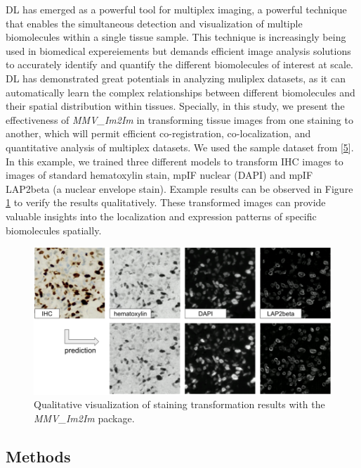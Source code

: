 DL has emerged as a powerful tool for multiplex imaging, a powerful technique that enables the simultaneous detection and visualization of multiple biomolecules within a single tissue sample. This technique is increasingly being used in biomedical expereiements but demands efficient image analysis solutions to accurately identify and quantify the different biomolecules of interest at scale. DL has demonstrated great potentials in analyzing muliplex datasets, as it can automatically learn the complex relationships between different biomolecules and their spatial distribution within tissues. Specially, in this study, we present the effectiveness of \emph{MMV\_Im2Im} in transforming tissue images from one staining to another, which will permit efficient co-registration, co-localization, and quantitative analysis of multiplex datasets. We used the sample dataset from {[}\protect\hyperlink{ref-WwenuBHa}{5}{]}. In this example, we trained three different models to transform IHC images to images of standard hematoxylin stain, mpIF nuclear (DAPI) and mpIF LAP2beta (a nuclear envelope stain). Example results can be observed in Figure \ref{fig:multiplex} to verify the results qualitatively. These transformed images can provide valuable insights into the localization and expression patterns of specific biomolecules spatially.

\begin{figure}
\hypertarget{fig:multiplex}{%
\centering
\includegraphics{images/multiplex.png}
\caption{Qualitative visualization of staining transformation results with the \emph{MMV\_Im2Im} package.}\label{fig:multiplex}
}
\end{figure}

\hypertarget{methods}{%
\subsection{Methods}\label{methods}}

